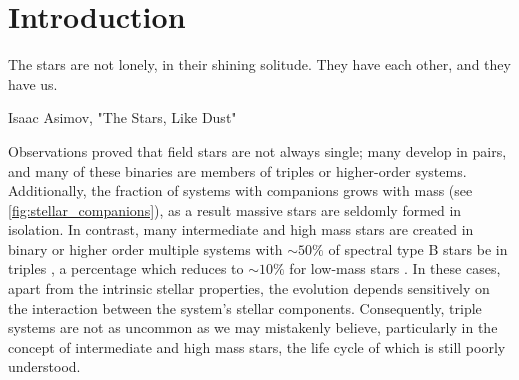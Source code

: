 \chapter{Introduction}

\epigraph{The stars are not lonely, in their shining solitude. They have each other, and they have us.}{Isaac Asimov, "The Stars, Like Dust"}


Observations proved that field stars are not always single; many develop in pairs, and many of these binaries are members of triples or higher-order systems. Additionally, the fraction of systems with companions grows with mass (see \cref{fig:stellar_companions}), as a result massive stars are seldomly formed in isolation. In contrast, many intermediate and high mass stars are created in binary or higher order multiple systems with $\sim 50\%$ of spectral type B stars be in triples \citep{sana2014southern,moe2017mind}, a percentage which reduces to $\sim 10\%$ for low-mass stars \citep{raghavan2010survey,toonen2014popcorn,moe2017mind}. In these cases, apart from the intrinsic stellar properties, the evolution depends sensitively on the interaction between the system's stellar components. Consequently, triple systems are not as uncommon as we may mistakenly believe, particularly in the concept of intermediate and high mass stars, the life cycle of which is still poorly understood.

